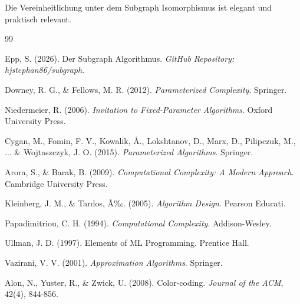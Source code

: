 ﻿\documentclass[a4paper,12pt]{article}
\theoremstyle{definition}
\begin{document}
Die Vereinheitlichung unter dem Subgraph Isomorphismus ist elegant und praktisch relevant.


\begin{thebibliography}{99}

 Epp, S. (2026). Der Subgraph Algorithmus. \emph{GitHub Repository: hjstephan86/subgraph}.

 Downey, R. G., \& Fellows, M. R. (2012). \emph{Parameterized Complexity}. Springer.

 Niedermeier, R. (2006). \emph{Invitation to Fixed-Parameter Algorithms}. Oxford University Press.

 Cygan, M., Fomin, F. V., Kowalik, Å., Lokshtanov, D., Marx, D., Pilipczuk, M., ... \& Wojtaszczyk, J. O. (2015). \emph{Parameterized Algorithms}. Springer.

 Arora, S., \& Barak, B. (2009). \emph{Computational Complexity: A Modern Approach}. Cambridge University Press.

 Kleinberg, J. M., \& Tardos, Ã‰. (2005). \emph{Algorithm Design}. Pearson Educati.

 Papadimitriou, C. H. (1994). \emph{Computational Complexity}. Addison-Wesley.

 Ullman, J. D. (1997). Elements of ML Programming. Prentice Hall.

 Vazirani, V. V. (2001). \emph{Approximation Algorithms}. Springer.

 Alon, N., Yuster, R., \& Zwick, U. (2008). Color-coding. \emph{Journal of the ACM}, 42(4), 844-856.

\end{thebibliography}
\end{document}
